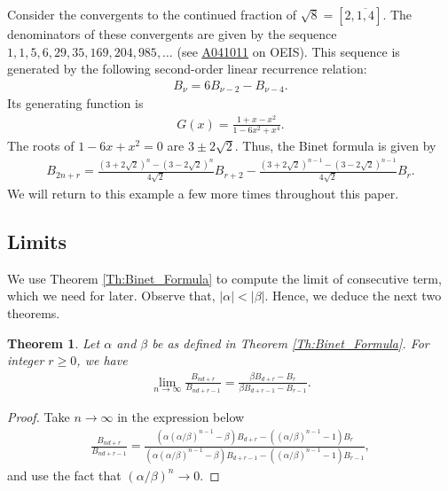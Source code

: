 \documentclass[12pt]{article}
\theoremstyle{plain}
\newtheorem{theorem}{Theorem}
\theoremstyle{definition}
\theoremstyle{remark}
\newcommand{\seqnum}[1]{\href{https://oeis.org/#1}{\rm \underline{#1}}}
\begin{document}
Consider the convergents to the continued fraction of $ \sqrt{8} = [2, \overline{1, 4}] $. The denominators of these convergents are given by the sequence $ 1, 1, 5, 6, 29, 35, 169, 204, 985, \ldots $ (see \seqnum{A041011} on OEIS). This sequence is generated by the following second-order linear recurrence relation:
\begin{align*}
	B_\nu = 6B_{\nu - 2} - B_{\nu - 4}.
\end{align*}
Its generating function is 
\begin{align*}
	G(x) = \frac{1 + x - x^2}{1 - 6x^2 + x^4}.
\end{align*}
The roots of $ 1 - 6x + x^2 = 0 $ are $ 3 \pm 2\sqrt{2} $. Thus, the Binet formula is given by
\begin{align*}
	B_{2n + r} = \frac{(3 + 2 \sqrt{2})^n - (3 - 2 \sqrt{2})^n}{4 \sqrt{2}} B_{r + 2} - \frac{(3 + 2 \sqrt{2})^{n - 1} - (3 - 2 \sqrt{2})^{n - 1}}{4 \sqrt{2}} B_r.
\end{align*}
We will return to this example a few more times throughout this paper.

\subsection{Limits}

We use Theorem \ref{Th:Binet_Formula} to compute the limit of consecutive term, which we need for later. Observe that, $ |\alpha| < |\beta| $. Hence, we deduce the next two theorems.
\begin{theorem} \label{Th:Limit_of_Consecutive_Terms} Let $ \alpha $ and $ \beta $ be as defined in Theorem \ref{Th:Binet_Formula}. For integer $ r \geq 0 $, we have
\begin{align*}
	\lim_{n \rightarrow \infty} \frac{B_{nd + r}}{B_{nd + r - 1}} = \frac{\beta B_{d + r} - B_r}{\beta B_{d + r - 1} - B_{r - 1}}.
\end{align*}
\end{theorem}

\begin{proof} Take $ n \longrightarrow \infty $ in the expression below
\begin{align*}
	\frac{B_{nd + r}}{B_{nd + r - 1}} = \frac{(\alpha (\alpha/\beta)^{n - 1} - \beta) B_{d + r} - ((\alpha/\beta)^{n - 1} - 1) B_r}{(\alpha (\alpha/\beta)^{n - 1} - \beta) B_{d + r - 1} - ((\alpha/\beta)^{n - 1} - 1) B_{r - 1}},
\end{align*}
and use the fact that $ (\alpha/\beta)^n \longrightarrow 0 $.
\end{proof}
\end{document}
